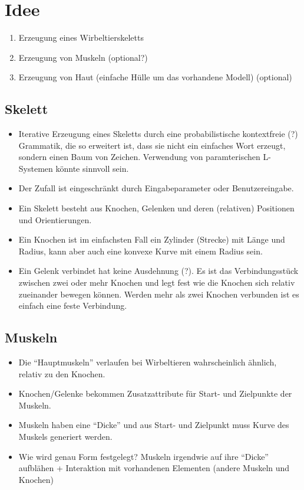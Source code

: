 \chapter{Idee}

\begin{enumerate}
 \item Erzeugung eines Wirbeltierskeletts
 \item Erzeugung von Muskeln (optional?)
 \item Erzeugung von Haut (einfache Hülle um das vorhandene Modell) (optional)
\end{enumerate}

\section{Skelett}

\begin{itemize}
 \item Iterative Erzeugung eines Skeletts durch eine probabilistische kontextfreie (?) Grammatik, die so erweitert ist, dass sie nicht ein einfaches Wort erzeugt, sondern einen Baum von Zeichen. Verwendung von paramterischen L-Systemen \cite{Paramteric_L-Systems} könnte sinnvoll sein.
 \item Der Zufall ist eingeschränkt durch Eingabeparameter oder Benutzereingabe.
 \item Ein Skelett besteht aus Knochen, Gelenken und deren (relativen) Positionen und Orientierungen.
 \item Ein Knochen ist im einfachsten Fall ein Zylinder (Strecke) mit Länge und Radius, kann aber auch eine konvexe Kurve mit einem Radius sein.
 \item Ein Gelenk verbindet hat keine Ausdehnung (?). Es ist das Verbindungsstück zwischen zwei oder mehr Knochen und legt fest wie die Knochen sich relativ zueinander bewegen können. Werden mehr als zwei Knochen verbunden ist es einfach eine feste Verbindung.
\end{itemize}

\section{Muskeln}

\begin{itemize}
 \item Die "`Hauptmuskeln"' verlaufen bei Wirbeltieren wahrscheinlich ähnlich, relativ zu den Knochen.
 \item Knochen/Gelenke bekommen Zusatzattribute für Start- und Zielpunkte der Muskeln.
 \item Muskeln haben eine "`Dicke"' und aus Start- und Zielpunkt muss Kurve des Muskels generiert werden.
 \item Wie wird genau Form festgelegt? Muskeln irgendwie auf ihre "`Dicke"' aufblähen + Interaktion mit vorhandenen Elementen (andere Muskeln und Knochen)
\end{itemize}

